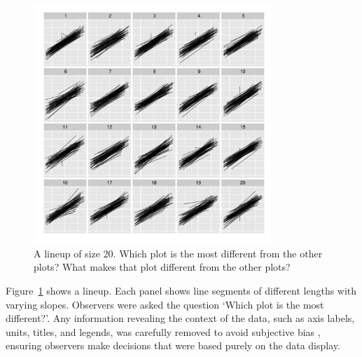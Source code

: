 \documentclass[12pt]{article}
\newcommand{\hh}[1]{{\color{orange} #1}}
\newcommand{\al}[1]{{\color{ForestGreen} #1}}
\newcommand{\alnote}[1]{\todo[inline,color=green!40]{#1}} %
\newcommand{\hhnote}[1]{\todo[inline,color=orange!40]{#1}}
\begin{document}
\begin{figure}
	\centering
	\includegraphics[width=0.8\textwidth]{normexam_fanned_lineup16.pdf}
	\caption{\label{fig:fanned} A lineup of size 20. Which plot is the most different from the other plots? What makes that plot different from the other plots?
	}
\end{figure}

Figure~\ref{fig:fanned} shows a lineup. Each panel shows  line segments of different lengths  with varying slopes. Observers were asked the question `Which plot is the most different?'.    Any  information revealing the context of the data, such as axis labels, units, titles, and legends,  was carefully removed to  avoid subjective bias \citep{meilgaard}, ensuring observers make decisions that were based purely on the data display. 
\end{document}
